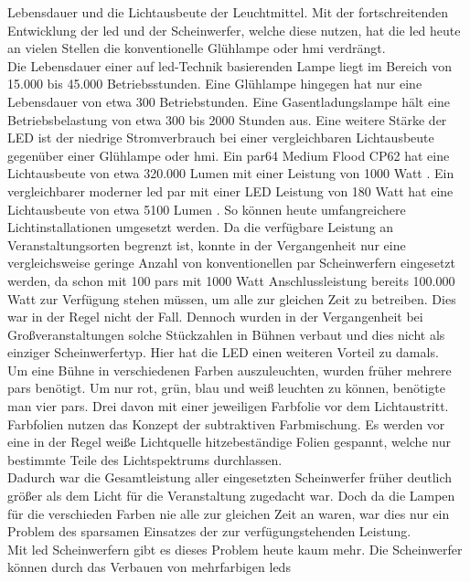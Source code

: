 \documentclass[11pt]{scrartcl}
\begin{document}
Lebensdauer und die Lichtausbeute der Leuchtmittel. Mit der fortschreitenden Entwicklung der \ac{led} und der
Scheinwerfer, welche diese nutzen, hat die \ac{led} heute an vielen Stellen die konventionelle Glühlampe oder \ac{hmi} verdrängt.\\
Die Lebensdauer einer auf \ac{led}-Technik basierenden Lampe liegt im Bereich von 15.000 bis 45.000 Betriebsstunden. Eine Glühlampe hingegen
hat nur eine Lebensdauer von etwa 300 Betriebstunden. Eine Gasentladungslampe hält eine Betriebsbelastung von etwa 300 bis 2000 Stunden aus.
Eine weitere Stärke der LED ist der niedrige Stromverbrauch bei einer vergleichbaren Lichtausbeute gegenüber einer Glühlampe oder \ac{hmi}.
Ein \ac{par}64 Medium Flood CP62 hat eine Lichtausbeute von etwa 320.000 Lumen mit einer Leistung von 1000 Watt \cite{convpar}. Ein %
vergleichbarer moderner \ac{led} \ac{par} mit einer LED Leistung von 180 Watt hat eine Lichtausbeute von etwa 5100 Lumen \cite{ledpar}. So
können heute umfangreichere Lichtinstallationen umgesetzt werden. Da die verfügbare Leistung an Veranstaltungsorten begrenzt ist, konnte in
der Vergangenheit nur eine vergleichsweise geringe Anzahl von konventionellen \ac{par} Scheinwerfern eingesetzt werden, da schon mit 100
\ac{par}s mit 1000 Watt Anschlussleistung bereits 100.000 Watt zur Verfügung stehen müssen, um alle zur gleichen Zeit zu betreiben. Dies
war in der Regel nicht der Fall. Dennoch wurden in der Vergangenheit bei Großveranstaltungen solche Stückzahlen in Bühnen verbaut und dies
nicht als einziger Scheinwerfertyp. Hier hat die LED einen weiteren Vorteil zu damals.\\
Um eine Bühne in verschiedenen Farben auszuleuchten, wurden früher mehrere \ac{par}s benötigt. Um nur rot, grün, blau und weiß leuchten zu
können, benötigte man vier \ac{par}s. Drei davon mit einer jeweiligen Farbfolie vor dem Lichtaustritt. Farbfolien nutzen das Konzept der
subtraktiven Farbmischung. Es werden vor eine in der Regel weiße Lichtquelle hitzebeständige Folien gespannt, welche nur bestimmte Teile
des  Lichtspektrums durchlassen.\\
Dadurch war die Gesamtleistung aller eingesetzten Scheinwerfer früher deutlich größer als dem Licht für die Veranstaltung zugedacht war.
Doch da die Lampen für die verschieden Farben nie alle zur gleichen Zeit an waren, war dies nur ein Problem des sparsamen Einsatzes der zur
verfügungstehenden Leistung.\\
Mit \ac{led} Scheinwerfern gibt es dieses Problem heute kaum mehr. Die Scheinwerfer können durch das Verbauen von mehrfarbigen \ac{led}s
\end{document}

